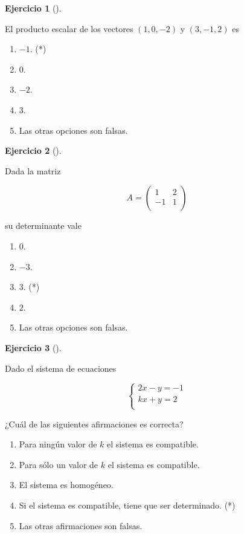 \documentclass[
  a4paper,
]{scrreport}
\theoremstyle{definition}
\newtheorem{exercise}{Ejercicio}[chapter]
\theoremstyle{remark}
\begin{document}
\begin{exercise}[]\protect\hypertarget{exr-10}{}\label{exr-10}

El producto escalar de los vectores \((1,0,-2)\) y \((3,-1,2)\) es

\begin{enumerate}
\def\labelenumi{\alph{enumi}.}
\item
  \(-1\). (*)
\item
  \(0\).
\item
  \(-2\).
\item
  \(3\).
\item
  Las otras opciones son falsas.
\end{enumerate}

\end{exercise}

\begin{exercise}[]\protect\hypertarget{exr-11}{}\label{exr-11}

Dada la matriz

\[
A=
\left(
\begin{array}{cc}
1 & 2 \\
-1 & 1 \\
\end{array}
\right)
\]

su determinante vale

\begin{enumerate}
\def\labelenumi{\alph{enumi}.}
\item
  \(0\).
\item
  \(-3\).
\item
  \(3\). (*)
\item
  \(2\).
\item
  Las otras opciones son falsas.
\end{enumerate}

\end{exercise}

\begin{exercise}[]\protect\hypertarget{exr-12}{}\label{exr-12}

Dado el sistema de ecuaciones

\[
\left\{
\begin{array}{l}
2x-y=-1 \\
kx+y=2 \\
\end{array}
\right.
\]

¿Cuál de las siguientes afirmaciones es correcta?

\begin{enumerate}
\def\labelenumi{\alph{enumi}.}
\item
  Para ningún valor de \(k\) el sistema es compatible.
\item
  Para sólo un valor de \(k\) el sistema es compatible.
\item
  El sistema es homogéneo.
\item
  Si el sistema es compatible, tiene que ser determinado. (*)
\item
  Las otras afirmaciones son falsas.
\end{enumerate}

\end{exercise}
\end{document}
